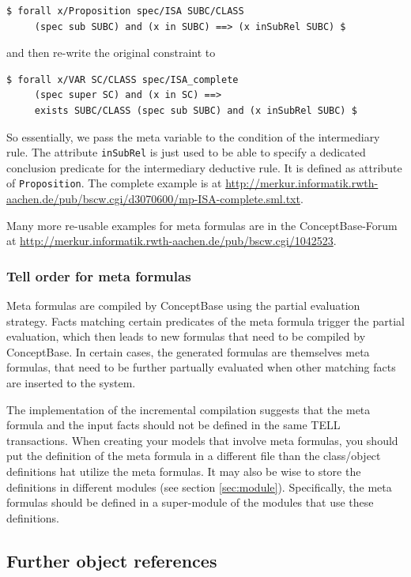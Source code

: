\begin{verbatim}
$ forall x/Proposition spec/ISA SUBC/CLASS
     (spec sub SUBC) and (x in SUBC) ==> (x inSubRel SUBC) $
\end{verbatim}

and then re-write the original constraint to

\begin{verbatim}
$ forall x/VAR SC/CLASS spec/ISA_complete 
     (spec super SC) and (x in SC) ==>
     exists SUBC/CLASS (spec sub SUBC) and (x inSubRel SUBC) $
\end{verbatim}

So essentially, we pass the meta variable to the condition of the intermediary rule.
The attribute {\tt inSubRel} is just used to be able to specify a dedicated conclusion
predicate for the intermediary deductive rule. It is defined as attribute of
{\tt Proposition}. The complete example is at
\url{http://merkur.informatik.rwth-aachen.de/pub/bscw.cgi/d3070600/mp-ISA-complete.sml.txt}.


Many more re-usable examples for meta formulas are in the ConceptBase-Forum at
\url{http://merkur.informatik.rwth-aachen.de/pub/bscw.cgi/1042523}.

\subsubsection{Tell order for meta formulas}

Meta formulas are compiled by ConceptBase using the partial evaluation strategy.
Facts matching certain predicates of the meta formula trigger
the partial evaluation, which then leads to new formulas that need to be compiled
by ConceptBase. In certain cases, the generated formulas are themselves meta formulas,
that need to be further partually evaluated when other matching facts are 
inserted to the system. 

The implementation of the incremental compilation suggests that the meta formula
and the input facts should not be defined in the same TELL transactions. 
When creating your models that involve meta formulas, you should put the
definition of the meta formula in a different file than the class/object
definitions hat utilize the meta formulas. It may also be wise to store the
definitions in different modules (see section \ref{sec:module}). Specifically, the
meta formulas should be defined in a super-module of the modules that use these definitions.




\subsection{Further object references}
\label{sec:ObjRef}

